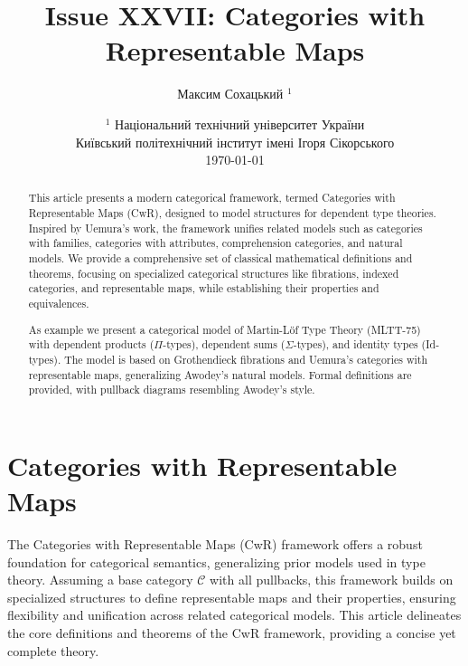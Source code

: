 \documentclass{article}
\theoremstyle{definition}
\begin{document}
\title{Issue XXVII: Categories with Representable Maps}
\author{Максим Сохацький $^1$}
\date{ $^1$ Національний технічний університет України \\
       \small Київський політехнічний інститут імені Ігоря Сікорського \\
       \today }

\maketitle

\ifincludeTOC
  \tableofcontents
\fi


\begin{abstract}
This article presents a modern categorical framework,
termed Categories with Representable Maps (CwR),
designed to model structures for dependent type theories.
Inspired by Uemura’s work, the framework unifies related
models such as categories with families, categories with attributes,
comprehension categories, and natural models.
We provide a comprehensive set of classical mathematical
definitions and theorems, focusing on specialized categorical
structures like fibrations, indexed categories, and representable maps,
while establishing their properties and equivalences.

As example we present a categorical model of Martin-Löf Type Theory (MLTT-75)
with dependent products ($\Pi$-types), dependent sums ($\Sigma$-types),
and identity types (Id-types). The model is based on Grothendieck fibrations
and Uemura’s categories with representable maps, generalizing Awodey’s natural models.
Formal definitions are provided, with pullback diagrams resembling Awodey’s style.
\end{abstract}

\section{Categories with Representable Maps}

The Categories with Representable Maps (CwR) framework offers a robust
foundation for categorical semantics, generalizing prior models used in type theory.
Assuming a base category \(\mathcal{C}\) with all pullbacks,
this framework builds on specialized structures to define representable
maps and their properties, ensuring flexibility and unification across
related categorical models. This article delineates the core definitions
and theorems of the CwR framework, providing a concise yet complete theory.
\end{document}
